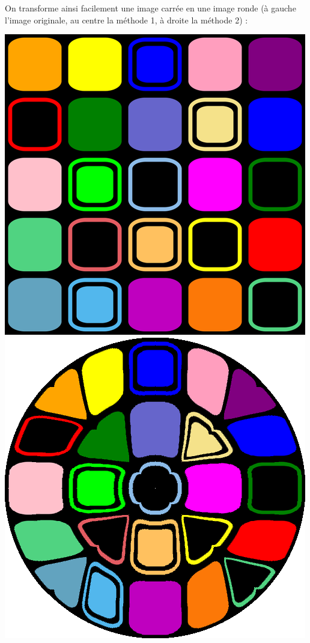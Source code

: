 \documentclass[11pt,class=report,crop=false]{standalone}
\begin{document}
On transforme ainsi facilement une image carrée en une image ronde (à gauche l'image originale, au centre la méthode 1, à droite la méthode 2) :
\begin{center}
	\includegraphics[scale=\myscale,scale=0.23]{figures/image_carre_avant} \qquad
	\includegraphics[scale=\myscale,scale=0.25]{figures/image_carre_apres_1} \qquad	

\end{center}
\end{document}
